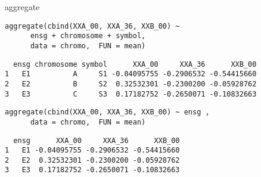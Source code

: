 \documentclass[xcolor={usenames,svgnames,dvipsnames}]{beamer}
\begin{document}
\begin{frame}[fragile,label=sec-3-8]{aggregate}
 \lstset{language=R,numbers=none}
\begin{lstlisting}
aggregate(cbind(XXA_00, XXA_36, XXB_00) ~
	  ensg + chromosome + symbol,
	  data = chromo,  FUN = mean)
\end{lstlisting}

\begin{verbatim}
  ensg chromosome symbol      XXA_00     XXA_36      XXB_00
1   E1          A     S1 -0.04095755 -0.2906532 -0.54415660
2   E2          B     S2  0.32532301 -0.2300200 -0.05928762
3   E3          C     S3  0.17182752 -0.2650071 -0.10832663
\end{verbatim}

\lstset{language=R,numbers=none}
\begin{lstlisting}
aggregate(cbind(XXA_00, XXA_36, XXB_00) ~ ensg ,
	  data = chromo,  FUN = mean)
\end{lstlisting}

\begin{verbatim}
  ensg      XXA_00     XXA_36      XXB_00
1   E1 -0.04095755 -0.2906532 -0.54415660
2   E2  0.32532301 -0.2300200 -0.05928762
3   E3  0.17182752 -0.2650071 -0.10832663
\end{verbatim}
\end{frame}
\end{document}
